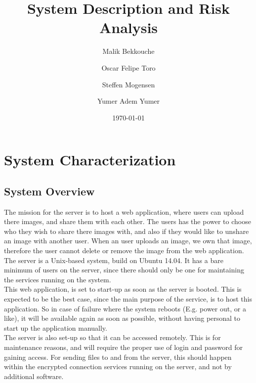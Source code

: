 \documentclass{article}
\title{\huge\sffamily\bfseries System Description and Risk Analysis}
\author{Malik Bekkouche \and Oscar Felipe Toro \and Steffen Mogensen \and  Yumer Adem Yumer}
\date{\today}
\begin{document}
\maketitle


\tableofcontents
\pagebreak


\section{System Characterization}

\subsection{System Overview}
The mission for the server is to host a web application, where users can upload there images, and share them with each other. The users has the power to choose who they wish to share there images with, and also if they would like to unshare an image with another user. When an user uploads an image, we own that image, therefore the user cannot delete or remove the image from the web application. \\

The server is a Unix-based system, build on Ubuntu 14.04. It has a bare minimum of users on the server, since there should only be one for maintaining the services running on the system.\\


This web application, is set to start-up as soon as the server is booted. This is expected to be the best case, since the main purpose of the service, is to host this application. So in case of failure where the system reboots (E.g. power out, or a like), it will be available again as soon as possible, without having personal to start up the application manually.\\

The server is also set-up so that it can be accessed remotely. This is for maintenance reasons, and will require the proper use of login and password for gaining access.
For sending files to and from the server, this should happen within the encrypted connection services running on the server, and not by additional software.
\end{document}
